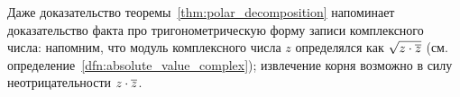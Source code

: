 \begin{remark}
Даже доказательство теоремы~\ref{thm:polar_decomposition}
 напоминает доказательство факта про
тригонометрическую форму записи комплексного числа: напомним, что
модуль комплексного числа $z$ определялся как $\sqrt{z\cdot\overline{z}}$
(см. определение~\ref{dfn:absolute_value_complex}); извлечение корня
возможно в силу неотрицательности $z\cdot\overline{z}$.
\end{remark}
